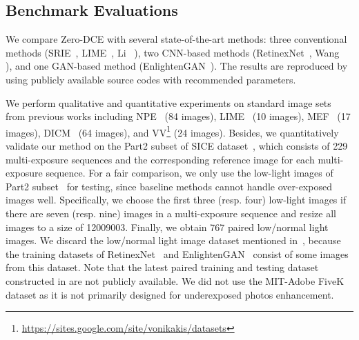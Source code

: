 \documentclass[10pt,twocolumn,letterpaper]{article}
\begin{document}
\subsection{Benchmark Evaluations}
We compare Zero-DCE with several state-of-the-art methods: three conventional methods (SRIE~\cite{Fu2016}, LIME~\cite{Guo2017}, Li \etal~\cite{Li2018}), two CNN-based methods (RetinexNet~\cite{Chen2018}, Wang \etal~\cite{Wang2019} ), and one GAN-based method (EnlightenGAN~\cite{Jiang2019}).
The results are reproduced by using publicly available source codes with recommended parameters.

We perform qualitative and quantitative experiments on standard image sets from previous works including NPE~\cite{Wang2013} (84 images), LIME~\cite{Guo2017} (10 images), MEF~\cite{Ma2015} (17 images), DICM~\cite{Lee2012} (64 images), and VV\footnote[3]{\url{https://sites.google.com/site/vonikakis/datasets}}  (24 images).
Besides, we quantitatively validate our method on the Part2 subset of SICE dataset~\cite{Cai2018}, which consists of 229 multi-exposure sequences and the corresponding reference image for each multi-exposure sequence.
For a fair comparison, we only use the low-light images of Part2 subset~\cite{Cai2018} for testing, since baseline methods cannot handle over-exposed images well.
Specifically, we choose the first three (resp. four) low-light images if there are seven (resp. nine) images in a multi-exposure sequence and resize all images to a size of 12009003.
Finally, we obtain 767 paired low/normal light images.
We discard the low/normal light image dataset mentioned in~\cite{2019arXiv190404474Y}, because the training datasets of RetinexNet~\cite{Chen2018} and EnlightenGAN~\cite{Jiang2019} consist of some images from this dataset. Note that the latest paired training and testing dataset constructed in \cite{Wang2019} are not publicly available. We did not use the MIT-Adobe FiveK dataset \cite{Adobe5K} as it is not primarily designed for underexposed photos enhancement.
\end{document}
